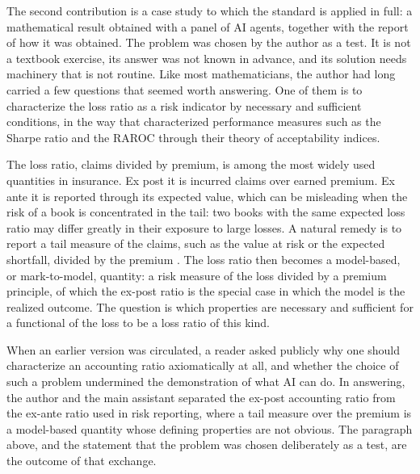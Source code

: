 The second contribution is a case study to which the standard is applied in full: a mathematical result obtained
with a panel of AI agents, together with the report of how it was obtained. The problem was chosen by the author as
a test. It is not a textbook exercise, its answer was not known in advance, and its solution needs machinery that is
not routine. Like most mathematicians, the author had long carried a few questions that seemed worth answering. One
of them is to characterize the loss ratio as a risk indicator by necessary and sufficient conditions, in the way
that \citet{chernymadan2009} characterized performance measures such as the Sharpe ratio and the RAROC through
their theory of acceptability indices.

The loss ratio, claims divided by premium, is among the most widely used quantities in insurance. Ex post it is
incurred claims over earned premium. Ex ante it is reported through its expected value, which can be misleading
when the risk of a book is concentrated in the tail: two books with the same expected loss ratio may differ greatly
in their exposure to large losses. A natural remedy is to report a tail measure of the claims, such as the value at
risk or the expected shortfall, divided by the premium \citep{adeh1999}. The loss ratio then becomes a model-based,
or mark-to-model, quantity: a risk measure of the loss divided by a premium principle, of which the ex-post ratio is
the special case in which the model is the realized outcome. The question is which properties are necessary and
sufficient for a functional of the loss to be a loss ratio of this kind.

\begin{discussion}
When an earlier version was circulated, a reader asked publicly why one should characterize an accounting ratio
axiomatically at all, and whether the choice of such a problem undermined the demonstration of what AI can do. In
answering, the author and the main assistant separated the ex-post accounting ratio from the ex-ante ratio used in
risk reporting, where a tail measure over the premium is a model-based quantity whose defining properties are not
obvious. The paragraph above, and the statement that the problem was chosen deliberately as a test, are the outcome
of that exchange.
\end{discussion}

